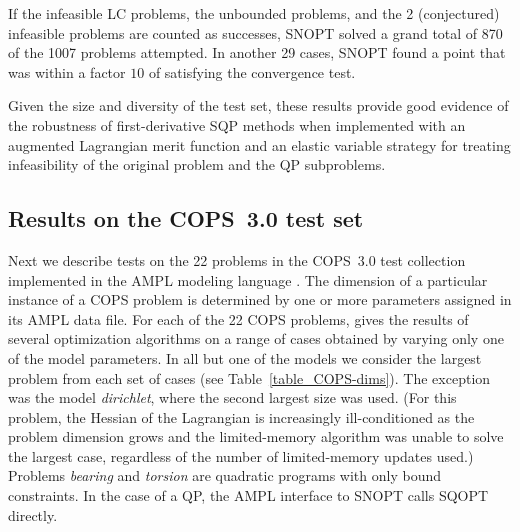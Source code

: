\documentclass[draft,leqno,onefignum,onetabnum]{siamltex}
\def\AMPL  {{\small AMPL}}
\def\COPS  {{\small COPS}}
\def\SNOPT {{\small SNOPT}}
\def\SQOPT {{\small SQOPT}}
\def\Cute#1{\hbox{\it\lowercase{#1}\/}}
\begin{document}
If the infeasible LC problems, the unbounded problems, and the 2
(conjectured) infeasible problems are counted as successes, \SNOPT{}
solved a grand total of 870
of the 1007 problems attempted.  In another 29 cases, \SNOPT{} found a
point that was within a factor $10$ of satisfying the convergence
test.

Given the size and diversity of the test set, these results
provide good evidence of the robustness of first-derivative SQP
methods when implemented with an augmented Lagrangian merit function
and an elastic variable strategy for treating infeasibility of the
original problem and the QP subproblems.


\subsection{Results on the COPS~3.0 test set}  \label{sec-cops-results}

Next we describe tests on the 22 problems in the \COPS~3.0 test
collection \cite{BonDM98,DolM00,DolM02} implemented in the \AMPL{}
modeling language \cite{FGK93,AMPL2,AMPL}.  The dimension of a particular
instance of a \COPS{} problem is determined by one or more parameters
assigned in its \AMPL{} data file.  For each of the 22 \COPS{}
problems, \cite{DolMM04} gives the results of
several optimization algorithms on a range of cases obtained by
varying only one of the model parameters.  In all but one of the
models we consider the largest problem from each set of cases
(see Table~\ref{table_COPS-dims}).  The exception was the model
\Cute{dirichlet}, where the second largest size was used. (For this
problem, the Hessian of the Lagrangian is increasingly ill-conditioned
as the problem dimension grows and the limited-memory algorithm was
unable to solve the largest case, regardless of the number of
limited-memory updates used.)  Problems \Cute{bearing} and
\Cute{torsion} are quadratic programs with only bound constraints. In
the case of a QP, the \AMPL{} interface to \SNOPT{} calls \SQOPT{}
directly.
\end{document}
